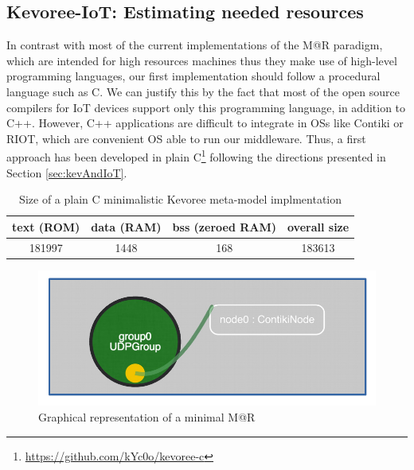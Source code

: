 \subsection{Kevoree-IoT: Estimating needed resources}
\label{subsec:MARImpl}
In contrast with most of the current implementations of the M@R paradigm, which are intended for high resources machines thus they make use of high-level programming languages, our first implementation should follow a procedural language such as C.
We can justify this by the fact that most of the open source compilers for IoT devices support only this programming language, in addition to C++.
However, C++ applications are difficult to integrate in OSs like Contiki or RIOT, which are convenient OS able to run our middleware.
Thus, a first approach has been developed in plain C\footnote{\url{https://github.com/kYc0o/kevoree-c}} following the directions presented in Section \ref{sec:kevAndIoT}.

\begin{table}[]
	\centering
	\caption{Size of a plain C minimalistic Kevoree meta-model implmentation}
	\label{tab:kevoreeC}
	\begin{tabular}{|c|c|c|c|}
		\hline
		\textbf{text (ROM)}   & \textbf{data (RAM)} & \textbf{bss (zeroed RAM)} & \textbf{overall size} \\ \hline
		181997 & 1448 & 168 & 183613 \\ \hline
	\end{tabular}
\end{table}

\begin{figure}[]
	\centering
	\includegraphics[width=0.55\columnwidth]{chapters/modelsAtRuntimeContiki.images/MAR_example.pdf}
	\caption{Graphical representation of a minimal M@R}
	\label{fig:1stModelC}
\end{figure}

